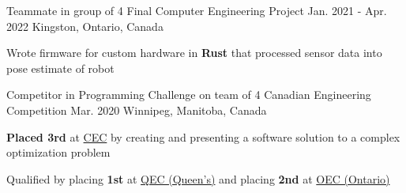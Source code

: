 
\begin{cventries}

  \cventry
    {Teammate in group of 4} %
    {Final Computer Engineering Project} %
    {Jan. 2021 - Apr. 2022} %
    {Kingston, Ontario, Canada} %
    {
      \begin{cvitems} %
        \item{Wrote firmware for custom hardware in \textbf{Rust} that processed sensor data into pose estimate of robot
        }
      \end{cvitems}
    }

  \cventry
    {Competitor in Programming Challenge on team of 4} %
    {Canadian Engineering Competition} %
    {Mar. 2020} %
    {Winnipeg, Manitoba, Canada} %
    {
      \begin{cvitems} %
        \item{\textbf{Placed 3rd} at \href{https://cfes.ca/cec/}{CEC} by creating and presenting a software solution to a complex optimization problem}
        \item{Qualified by placing \textbf{1st} at \href{https://quengcomp.ca/}{QEC (Queen's)} and placing \textbf{2nd} at \href{https://www.oec2020.ca/}{OEC (Ontario)}}
      \end{cvitems}
    }


\end{cventries}
